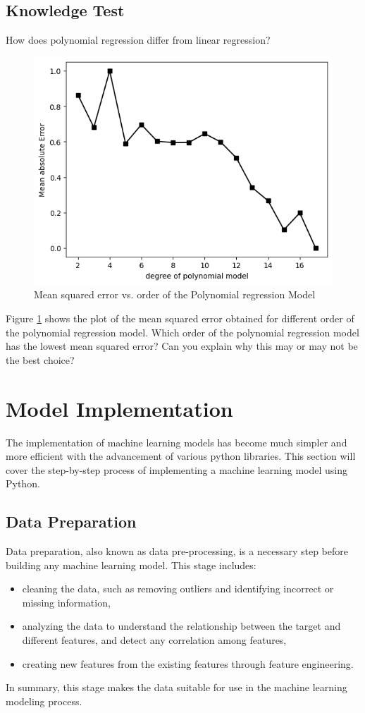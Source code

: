 {\newpage
\subsection{Knowledge Test}
\begin{questions}

\question How does polynomial regression differ from linear regression?

\begin{figure}[!h]
  \centering
  \includegraphics[width=6 cm]{order_poly.png}
  \caption{Mean squared error vs. order of the Polynomial regression Model}
  \label{fig:polyOrder}
\end{figure}

\question Figure \ref{fig:polyOrder} shows the plot of the mean squared error obtained for different order of the polynomial regression model. Which order of the polynomial regression model has the lowest mean squared error? Can you explain why this may or may not be the best choice?
\end{questions}

\newpage

\section{Model Implementation}\label{sec:model}
The implementation of machine learning models has become much simpler and more efficient with the advancement of various python libraries. This section will cover the step-by-step process of implementing a machine learning model using Python.

\subsection{Data Preparation}
Data preparation, also known as data pre-processing, is a necessary step before building any machine learning model. This stage includes:
\begin{itemize}
  \item cleaning the data, such as removing outliers and identifying incorrect or missing information,
  \item analyzing the data to understand the relationship between the target and different features, and detect any correlation among features,
  \item creating new features from the existing features through feature engineering.
\end{itemize}In summary, this stage makes the data suitable for use in the machine learning modeling process.


}
